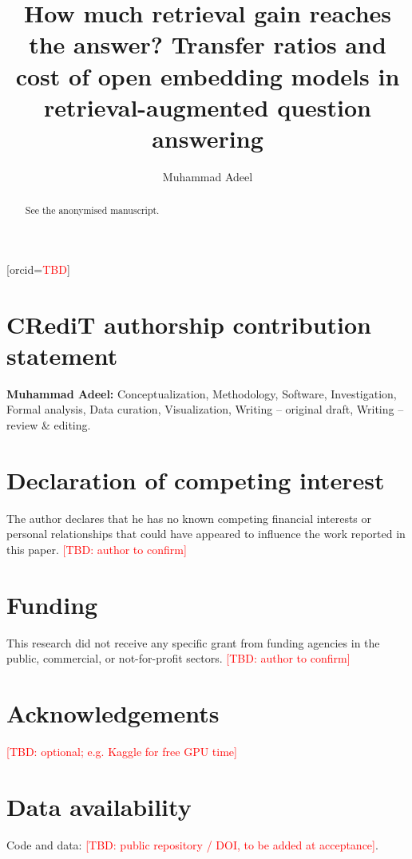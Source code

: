 \documentclass[a4paper,fleqn]{cas-sc}
\begin{document}
\let\WriteBookmarks\relax
{}

\title[mode=title]{How much retrieval gain reaches the answer? Transfer ratios and cost of open embedding models in retrieval-augmented question answering}

\author[1]{Muhammad Adeel}[orcid=\textcolor{red}{TBD}]
\cormark[1]

\begin{abstract}
See the anonymised manuscript.
\end{abstract}

\maketitle

\section*{CRediT authorship contribution statement}
\textbf{Muhammad Adeel:} Conceptualization, Methodology, Software, Investigation, Formal analysis, Data curation, Visualization, Writing -- original draft, Writing -- review \& editing.

\section*{Declaration of competing interest}
The author declares that he has no known competing financial interests or personal relationships that could have appeared to influence the work reported in this paper. \textcolor{red}{[TBD: author to confirm]}

\section*{Funding}
This research did not receive any specific grant from funding agencies in the public, commercial, or not-for-profit sectors. \textcolor{red}{[TBD: author to confirm]}

\section*{Acknowledgements}
\textcolor{red}{[TBD: optional; e.g. Kaggle for free GPU time]}

\section*{Data availability}
Code and data: \textcolor{red}{[TBD: public repository / DOI, to be added at acceptance]}.
\end{document}
